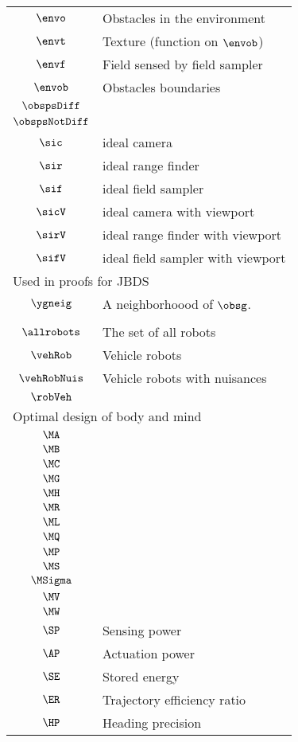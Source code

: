 \begin{longtable}{cl}
 $\envo$ &  Obstacles in the environment\\ 
 $\envt$ &  Texture (function on $\envob$)\\ 
 $\envf$ &  Field sensed by field sampler\\ 
 $\envob$ &  Obstacles boundaries\\ 
 $\obspsDiff$ & \\ 
 $\obspsNotDiff$ & \\ 
 $\sic$ &  ideal camera\\ 
 $\sir$ &  ideal range finder\\ 
 $\sif$ &  ideal field sampler\\ 
 $\sicV$ &  ideal camera with viewport\\ 
 $\sirV$ &  ideal range finder with viewport\\ 
 $\sifV$ &  ideal field sampler with viewport\\ 
 \multicolumn{2}{l}{Used in proofs for JBDS}\\ 
 \hline
$\ygneig$ &  A neighborhoood of $\obsg$.\\ 
 \multicolumn{2}{l}{}\\ 
 \hline
$\allrobots$ &  The set of all robots\\ 
 $\vehRob$ &  Vehicle robots\\ 
 $\vehRobNuis$ &  Vehicle robots with nuisances\\ 
 $\robVeh$ & \\ 
 \multicolumn{2}{l}{Optimal design of body and mind}\\ 
 \hline
$\MA$ & \\ 
 $\MB$ & \\ 
 $\MC$ & \\ 
 $\MG$ & \\ 
 $\MH$ & \\ 
 $\MR$ & \\ 
 $\ML$ & \\ 
 $\MQ$ & \\ 
 $\MP$ & \\ 
 $\MS$ & \\ 
 $\MSigma$ & \\ 
 $\MV$ & \\ 
 $\MW$ & \\ 
 $\SP$ &  Sensing power\\ 
 $\AP$ &  Actuation power\\ 
 $\SE$ &  Stored energy\\ 
 $\ER$ &  Trajectory efficiency ratio\\ 
 $\HP$ &  Heading precision\\ 

\end{longtable}
